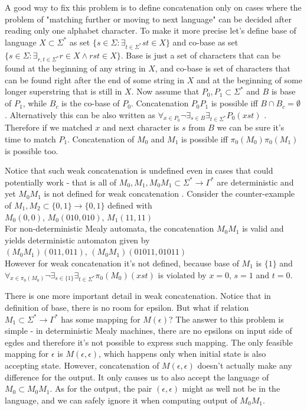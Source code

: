 \documentclass[12pt]{article}
\begin{document}
A good way to fix this problem is to define concatenation only on cases where the problem of "matching further or moving to next language" can be decided after reading only one alphabet character. To make it more precise let's define base of language $X \subset \Sigma^*$ as set $\{s\in\Sigma : \exists_{t\in\Sigma^*}st\in X\}$ and co-base as set  $\{s\in\Sigma : \exists_{r,t\in\Sigma^*}r\in X \wedge rst\in X\}$. Base is just a set of characters that can be found at the beginning of any string in $X$, and co-base is set of characters that can be found right after the end of some string in $X$ and at the beginning of some longer superstring that is still in $X$. Now assume that $P_0,P_1 \subset \Sigma^*$ and $B$ is base of $P_1$, while $B_c$ is the co-base of $P_0$. Concatenation $P_0P_1$ is possible iff $B\cap B_c = \emptyset$. Alternatively this can be also written as $\forall_{x\in P_0} \neg \exists_{s\in B} \exists_{t\in\Sigma^*} P_0(xst)$ . Therefore if we matched $x$ and next character is $s$ from $B$ we can be sure it's time to match $P_1$. Concatenation of $M_0$ and $M_1$ is possible iff $\pi_0(M_0)\pi_0(M_1)$ is possible too. 

Notice that such weak concatenation is undefined even in cases that could potentially work - that is all of $M_0,M_1,M_0M_1 \subset \Sigma^* \rightarrow \Gamma^*$ are deterministic and yet $M_0M_1$ is not defined for weak concatenation . Consider the counter-example of $M_1,M_2 \subset \{0,1\}\rightarrow\{0,1\}$ defined with \\
$M_0(0,0)$,  $M_0(010,010)$, $M_1(11,11)$ \\
For non-deterministic Mealy automata, the concatenation $M_0M_1$ is valid and yields deterministic automaton given by \\
$(M_0M_1)(011,011)$,  $(M_0M_1)(01011,01011)$ \\
However for weak concatenation it's not defined, because base of $M_1$ is $\{1\}$ and  $\forall_{x\in \pi_0(M_0)} \neg \exists_{s\in\{1\}} \exists_{t\in\Sigma^*} \pi_0(M_0)(xst)$ is violated by $x=0$, $s=1$ and $t=0$.


There is one more important detail in weak concatenation. Notice that in definition of base, there is no room for epsilon. But what if relation $M_1 \subset \Sigma^* \rightarrow \Gamma^*$ has some mapping for $M(\epsilon)$? The answer to this problem is simple - in deterministic Mealy machines, there are no epsilons on input side of egdes and therefore it's not possible to express such mapping. The only feasible mapping for $\epsilon$ is $M(\epsilon,\epsilon)$, which happens only when initial state is also accepting state. However, concatenation of $M(\epsilon,\epsilon)$ doesn't actually make any difference for the output. It only causes us to also accept the language of $M_0 \subset M_0M_1 $. As for the output, the pair $(\epsilon,\epsilon)$ might as well not be in the language, and we can safely ignore it when computing output of $M_0M_1$.  
\end{document}
